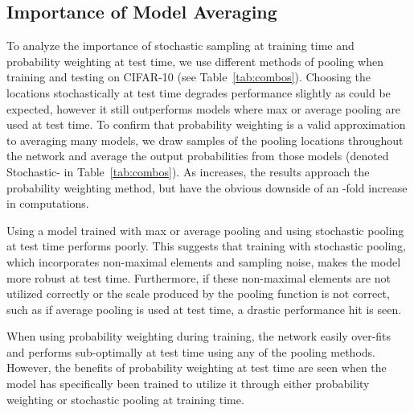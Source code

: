 \documentclass{article} \usepackage{nips12submit_e,times}
\newcommand{\tab}[1]{Table~\ref{tab:#1}}
\begin{document}
\subsection{Importance of Model Averaging} \label{sec:averaging}
\vspace{-1mm}
To analyze the importance of stochastic sampling at training time and
probability weighting at test time, we use different methods of
pooling when training and testing on CIFAR-10 (see
\tab{combos}). Choosing the locations stochastically at test time
degrades performance slightly as could be expected, however it still
outperforms models where max or average pooling are used at test
time. To confirm that probability weighting is a valid approximation to averaging many models, we draw  samples
of the pooling locations throughout the network and average the output probabilities from those 
models (denoted Stochastic- in \tab{combos}). As  increases, the results approach the
probability weighting method, but have the obvious downside of an -fold increase in computations.

Using a model trained with max or average
pooling and using stochastic pooling at test time performs
poorly. This suggests that training with stochastic pooling, which
incorporates non-maximal elements and sampling noise, makes the model
more robust at test time. Furthermore, if these non-maximal elements
are not utilized correctly or the scale produced by the pooling
function is not correct, such as if average pooling is used at test
time, a drastic performance hit is seen.

When using probability weighting during training, the network easily
over-fits and performs sub-optimally at test time using any of the
pooling methods. However, the benefits of probability
weighting at test time are seen when the model has specifically
been trained to utilize it through either probability weighting or
stochastic pooling at training time.
\end{document}
